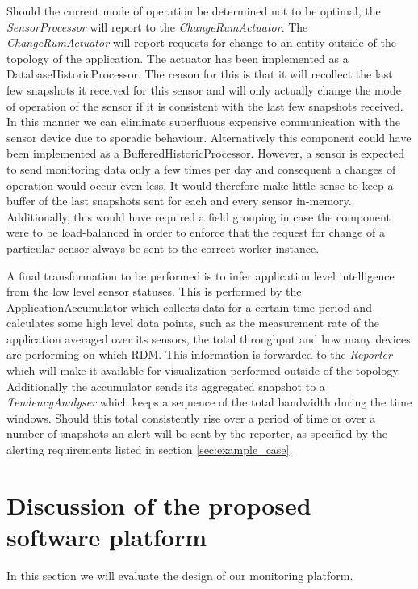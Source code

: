 Should the current mode of operation be determined not to be optimal, the \emph{SensorProcessor} will report to the \emph{ChangeRumActuator}. The \emph{ChangeRumActuator} will report requests for change to an entity outside of the topology of the application. The actuator has been implemented as a DatabaseHistoricProcessor. The reason for this is that it will recollect the last few snapshots it received for this sensor and will only actually change the mode of operation of the sensor if it is consistent with the last few snapshots received. In this manner we can eliminate superfluous expensive communication with the sensor device due to sporadic behaviour. Alternatively this component could have been implemented as a BufferedHistoricProcessor. However, a sensor is expected to send monitoring data only a few times per day and consequent a changes of operation would occur even less. It would therefore make little sense to keep a buffer of the last snapshots sent for each and every sensor in-memory. Additionally, this would have required a field grouping in case the component were to be load-balanced in order to enforce that the request for change of a particular sensor always be sent to the correct worker instance.

A final transformation to be performed is to infer application level intelligence from the low level sensor statuses. This is performed by the ApplicationAccumulator which collects data for a certain time period and calculates some high level data points, such as the measurement rate of the application averaged over its sensors, the total throughput and how many devices are performing on which RDM. This information is forwarded to the \emph{Reporter} which will make it available for visualization performed outside of the topology. Additionally the accumulator sends its aggregated snapshot to a \emph{TendencyAnalyser} which keeps a sequence of the total bandwidth during the time windows. Should this total consistently rise over a period of time or over a number of snapshots an alert will be sent by the reporter, as specified by the alerting requirements listed in section \ref{sec:example_case}.
	
\section{Discussion of the proposed software platform}
In this section we will evaluate the design of our monitoring platform. 

